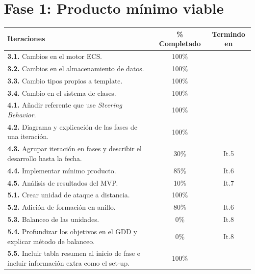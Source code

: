 \section{Fase 1: Producto mínimo viable}
\begin{longtable}[c]{|p{7cm}|c|c|}
\hline
Iteraciones                                               & \% Completado & Termindo en \\ 
\hline
\endhead
\textbf{3.1.} Cambios en el motor ECS.                     & 100\% &   \\
	\cmidrule[.003pt]{1-3}
\textbf{3.2.} Cambios en el almacenamiento de datos.       & 100\% &   \\ 
	\cmidrule[.003pt]{1-3}
\textbf{3.3.} Cambio tipos propios a template.             & 100\% &   \\ 
	\cmidrule[.003pt]{1-3}
\textbf{3.4.} Cambio en el sistema de clases.              & 100\% &   \\
	
	\cmidrule[1pt]{1-3}

\textbf{4.1.} Añadir referente que use 
				\textit{Steering Behavior}.                & 100\% &   \\
	\cmidrule[.003pt]{1-3}
\textbf{4.2.} Diagrama y explicación de las fases de 
				una iteración.                             & 100\% &   \\
	\cmidrule[.003pt]{1-3}
\textbf{4.3.} Agrupar iteración en fases y describir el
				desarrollo hasta la fecha.                 & 30\%  &  It.5 \\
	\cmidrule[.003pt]{1-3}
\textbf{4.4.} Implementar mínimo producto.                 & 85\%  &  It.6 \\
	\cmidrule[.003pt]{1-3}
\textbf{4.5.} Análisis de resultados del MVP.              & 10\%  &  It.7 \\
	
	\cmidrule[1pt]{1-3}
	
\textbf{5.1.} Crear unidad de ataque a distancia.          & 100\% &   \\
	\cmidrule[.003pt]{1-3}
\textbf{5.2.} Adición de formación en anillo.              & 80\%  &  It.6 \\ 
	\cmidrule[.003pt]{1-3}
\textbf{5.3.} Balanceo de las unidades.                    & 0\%   &  It.8 \\ 
	\cmidrule[.003pt]{1-3}		
\textbf{5.4.} Profundizar los objetivos en el GDD y 
				explicar método de balanceo.               & 0\%   &  It.8 \\ 
	\cmidrule[.003pt]{1-3}		
\textbf{5.5.} Incluir tabla resumen al inicio de fase
				e incluir información extra como el set-up.& 100\%  &  \\


\end{longtable}
